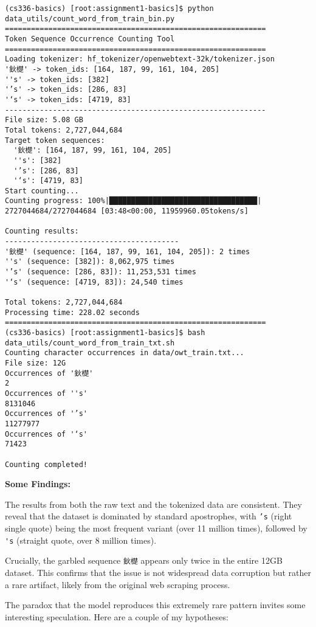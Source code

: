 \begin{lstlisting}
(cs336-basics) [root:assignment1-basics]$ python data_utils/count_word_from_train_bin.py 
============================================================
Token Sequence Occurrence Counting Tool
============================================================
Loading tokenizer: hf_tokenizer/openwebtext-32k/tokenizer.json
'鈥檚' -> token_ids: [164, 187, 99, 161, 104, 205]
''s' -> token_ids: [382]
'’s' -> token_ids: [286, 83]
'‘s' -> token_ids: [4719, 83]
------------------------------------------------------------
File size: 5.08 GB
Total tokens: 2,727,044,684
Target token sequences:
  '鈥檚': [164, 187, 99, 161, 104, 205]
  ''s': [382]
  '’s': [286, 83]
  '‘s': [4719, 83]
Start counting...
Counting progress: 100%|██████████████████████████████████| 2727044684/2727044684 [03:48<00:00, 11959960.05tokens/s]

Counting results:
----------------------------------------
'鈥檚' (sequence: [164, 187, 99, 161, 104, 205]): 2 times
''s' (sequence: [382]): 8,062,975 times
'’s' (sequence: [286, 83]): 11,253,531 times
'‘s' (sequence: [4719, 83]): 24,540 times

Total tokens: 2,727,044,684
Processing time: 228.02 seconds
============================================================
(cs336-basics) [root:assignment1-basics]$ bash data_utils/count_word_from_train_txt.sh 
Counting character occurrences in data/owt_train.txt...
File size: 12G
Occurrences of '鈥檚'
2
Occurrences of ''s'
8131046
Occurrences of '’s'
11277977
Occurrences of '‘s'
71423

Counting completed!
\end{lstlisting}

\textbf{Some Findings:}

The results from both the raw text and the tokenized data are consistent. They reveal that the dataset is dominated by standard apostrophes, with \lstinline{’s} (right single quote) being the most frequent variant (over 11 million times), followed by \lstinline{'s} (straight quote, over 8 million times).

Crucially, the garbled sequence \lstinline{鈥檚} appears only twice in the entire 12GB dataset. This confirms that the issue is not widespread data corruption but rather a rare artifact, likely from the original web scraping process.

The paradox that the model reproduces this extremely rare pattern invites some interesting speculation. Here are a couple of my hypotheses:

